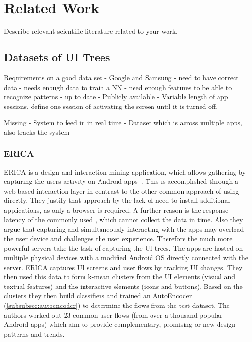 \chapter{Related Work}

Describe relevant scientific literature related to your work.


\section{Datasets of UI Trees}
\label{sec:datasets-of-ui-trees}

Requirements on a good data set
- Google and Samsung
- need to have correct data
- needs enough data to train a NN
- need enough features to be able to recognize patterns
- up to date
- Publicly available
- Variable length of app sessions, define one session of activating the screen until it is turned off.

Missing
- System to feed in in real time
- Dataset which is across multiple apps, also tracks the system
-

\subsection{ERICA}
\label{subsec:erica}

ERICA is a design and interaction mining application, which allows gathering  by capturing the users activity on Android apps~\cite{deka2016erica}.
This is accomplished through a web-based interaction layer in contrast to the other common approach of using  directly.
They justify that approach by the lack of need to install additional applications, as only a browser is required.
A further reason is the response latency of the commonly used , which cannot collect the data in time.
Also they argue that capturing and simultaneously interacting with the apps may overload the user device and challenges the user experience.
Therefore the much more powerful servers take the task of capturing the UI trees.
The apps are hosted on multiple physical devices with a modified Android OS directly connected with the server.
ERICA captures UI screens and user flows by tracking UI changes.
They then used this data to form k-mean clusters from the UI elements (visual and textual features) and the interactive elements (icons and buttons).
Based on the clusters they then build classifiers and trained an AutoEncoder (\ref{subsubsec:autoencoder}) to determine the flows from the test dataset.
The authors worked out 23 common user flows (from over a thousand popular Android apps) which aim to provide complementary, promising or new design patterns and trends.

